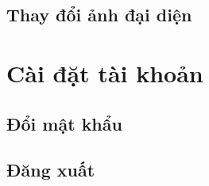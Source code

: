 \subsection{Thay đổi ảnh đại diện}


\section{Cài đặt tài khoản}

\subsection{Đổi mật khẩu}


\subsection{Đăng xuất}


